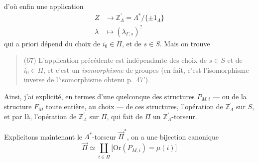 \documentclass[11pt,a4paper]{article}
\begin{document}
d'où enfin une application
\[
\tag{66}
\begin{aligned}
Z &\longrightarrow \mathbb{Z}^{\prime}_\Lambda = \Lambda^{*}/\{\pm1_\Lambda\}\\
\lambda &\longmapsto (\lambda_{\Gamma,s})^{\text{?}}
\end{aligned}
\]
qui a priori dépend du choix de $i_0\in\Pi$, et de $s\in S$. Mais on trouve
\begin{quote}
(67) L'application précédente est indépendante des choix de $s\in S$ et de $i_0\in\Pi$, et c'est
un \emph{isomorphisme} de groupes (en fait, c'est l'isomorphisme inverse de l'isomorphisme obtenu
p.~47').
\end{quote}
Ainsi, j'ai explicité, en termes d'une quelconque des structures $P_{M,i}$ — ou de la structure
$F_M$ toute entière, au choix — \struck{\ill{}}   de ces structures,
l'opération de $\mathbb{Z}^{\prime}_\Lambda$ sur $S$, et par là, l'opération de
$\mathbb{Z}^{\prime}_\Lambda$ sur $\Pi$, qui fait de $\Pi$ un $\mathbb{Z}^{\prime}_\Lambda$-torseur.

Explicitons maintenant le $\Lambda^{*}$-torseur $\vec{\Pi}^{*}$, on a une bijection canonique
\[
\tag{68}
\vec{\Pi} \simeq \coprod_{i\in\Pi}\bigl[\mathrm{Or}(P_{M,i}) = \mu(i)\bigr]
\]
\end{document}
